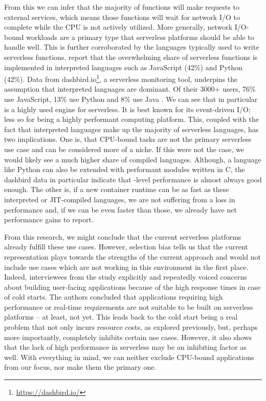 From this we can infer that the majority of functions will make requests to external services, which means those functions will wait for network I/O to complete while the CPU is not actively utilized. More generally, network I/O-bound workloads are a primary type that serverless platforms should be able to handle well. This is further corroborated by the languages typically used to write serverless functions. \citeauthor{Eismann2021} report that the overwhelming share of serverless functions is implemented in interpreted languages such as JavaScript (42\%) and Python (42\%). Data from dashbird.io\footnote{\url{https://dashbird.io/}}, a serverless monitoring tool, underpins the assumption that interpreted languages are dominant. Of their 3000+ users, 76\% use JavaScript, 13\% use Python and 8\% use Java \cite{Rehemaegi2019}. We can see that  in particular is a highly used engine for serverless. It is best known for its event-driven I/O; less so for being a highly performant computing platform. This, coupled with the fact that interpreted languages make up the majority of serverless languages, has two implications.
One is, that CPU-bound tasks are not the primary serverless use case and can be considered more of a niche. If this were not the case, we would likely see a much higher share of compiled languages. Although, a language like Python can also be extended with performant modules written in C, the dashbird data in particular indicate that -level performance is almost always good enough.
The other is, if a new container runtime can be as fast as these interpreted or JIT-compiled languages, we are not suffering from a loss in performance and, if we can be even faster than those, we already have net performance gains to report.

From this research, we might conclude that the current serverless platforms already fulfill these use cases. However, selection bias tells us that the current representation plays towards the strengths of the current approach and would not include use cases which are not working in this environment in the first place.
Indeed, interviewees from the \citeauthor{Leitner2019} study explicitly and repeatedly voiced concerns about building user-facing applications because of the high response times in case of cold starts. The authors concluded that applications requiring high performance or real-time requirements are not suitable to be built on serverless platforms -- at least, not yet. This leads back to the cold start being a real problem that not only incurs resource costs, as explored previously, but, perhaps more importantly, completely inhibits certain use cases.
However, it also shows that the lack of high performance in serverless may be an inhibiting factor as well. With everything in mind, we can neither exclude CPU-bound applications from our focus, nor make them the primary one.

